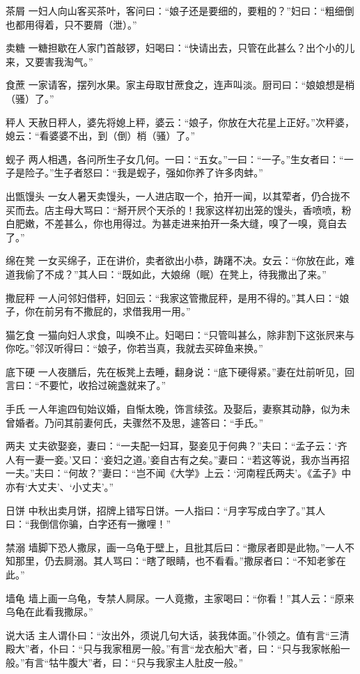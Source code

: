 \documentclass[12pt,UTF8]{ctexbook}
\begin{document}
茶屑
一妇人向山客买茶叶，客问曰：“娘子还是要细的，要粗的？”妇曰：“粗细倒也都用得着，只不要屑（泄）。”

卖糖
一糖担歇在人家门首敲锣，妇喝曰：“快请出去，只管在此甚么？出个小的儿来，又要害我淘气。”

食蔗
一家请客，摆列水果。家主母取甘蔗食之，连声叫淡。厨司曰：“娘娘想是梢（骚）了。”

秤人
天赦日秤人，婆先将媳上秤，婆云：“娘子，你放在大花星上正好。”次秤婆，媳云：“看婆婆不出，到（倒）梢（骚）了。”

蚬子
两人相遇，各问所生子女几何。一曰：“五女。”一曰：“一子。”生女者曰：“一子是险子。”生子者怒曰：“我是蚬子，强如你养了许多肉蚌。”

出甑馒头
一女人暑天卖馒头，一人进店取一个，拍开一闻，以其荤者，仍合拢不买而去。店主母大骂曰：“掰开屄个天杀的！我家这样初出笼的馒头，香喷喷，粉白肥嫩，不差甚么，你也用得过。为甚走进来拍开一条大缝，嗅了一嗅，竟自去了。”

绵在凳
一女买绵子，正在讲价，卖者欲出小恭，踌躇不决。女云：“你放在此，难道我偷了不成？”其人曰：“既如此，大娘绵（眠）在凳上，待我撒出了来。”

撒屁秤
一人问邻妇借秤，妇回云：“我家这管撒屁秤，是用不得的。”其人曰：“娘子，你在前另有不撒屁的，求借我用一用。”

猫乞食
一猫向妇人求食，叫唤不止。妇喝曰：“只管叫甚么，除非割下这张屄来与你吃。”邻汉听得曰：“娘子，你若当真，我就去买碎鱼来换。”

底下硬
一人夜膳后，先在板凳上去睡，翻身说：“底下硬得紧。”妻在灶前听见，回言曰：“不要忙，收拾过碗盏就来了。”

手氏
一人年逾四旬始议婚，自惭太晚，饰言续弦。及娶后，妻察其动静，似为未曾婚者。乃问其前妻何氏，夫骤然不及思，遽答曰：“手氏。”

两夫
丈夫欲娶妾，妻曰：“一夫配一妇耳，娶妾见于何典？”夫曰：“孟子云：‘齐人有一妻一妾。’又曰：‘妾妇之道。’妾自古有之矣。”妻曰：“若这等说，我亦当再招一夫。”夫曰：“何故？”妻曰：“岂不闻《大学》上云：‘河南程氏两夫’。《孟子》中亦有‘大丈夫’、‘小丈夫’。”

日饼
中秋出卖月饼，招牌上错写日饼。一人指曰：“月字写成白字了。”其人曰：“我倒信你骗，白字还有一撇哩！”

禁溺
墙脚下恐人撒尿，画一乌龟于壁上，且批其后曰：“撒尿者即是此物。”一人不知那里，仍去屙溺。其人骂曰：“瞎了眼睛，也不看看。”撒尿者曰：“不知老爹在此。”

墙龟
墙上画一乌龟，专禁人屙尿。一人竟撒，主家喝曰：“你看！”其人云：“原来乌龟在此看我撒尿。”

说大话
主人谓仆曰：“汝出外，须说几句大话，装我体面。”仆领之。值有言“三清殿大”者，仆曰：“只与我家租房一般。”有言“龙衣船大”者，曰：“只与我家帐船一般。”有言“牯牛腹大”者，曰：“只与我家主人肚皮一般。”
\end{document}
